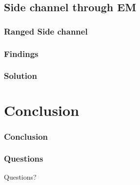 \documentclass{beamer}
\begin{document}
	\subsection{Side channel through EM }
		\begin{frame}
		\frametitle{Ranged Side channel}
		\end{frame}
		
		\begin{frame}
		\frametitle{Findings}
		\end{frame}
		
		\begin{frame}
		\frametitle{Solution}
		\end{frame}
\section{Conclusion}
	\begin{frame}
		\frametitle{Conclusion}
		\end{frame}	
		
		\begin{frame}
		\frametitle{Questions}
			\begin{center}
			\Huge Questions?
			\end{center}
		\end{frame}	
\end{document}
